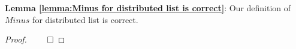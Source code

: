 {\noindent \bf Lemma \ref{lemma:Minus for distributed list is correct}}: Our definition of $Minus$ for distributed list is correct.
\begin {proof}
$\qed$
\end {proof}









    


